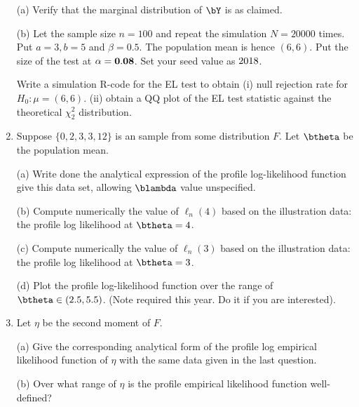 \begin{enumerate}
(a) Verify that the marginal distribution of $\bY$ is as claimed.

(b) Let the sample size $n=100$ and repeat the simulation $N=20000$ times.
Put $a = 3, b=5$ and $\beta = 0.5$. The population mean is hence
$(6, 6)$. Put the size of the test at $\alpha = {\bf 0.08}$. Set your seed value
as $2018\time7$.

Write a simulation R-code for the EL test to obtain 
(i) null rejection rate for  $H_0: \mu = (6, 6)$.
(ii) obtain a QQ plot of the EL test statistic against the theoretical $\chi_2^2$ distribution.

\item
Suppose $\{0, 2, 3, 3, 12\}$ is an \iid sample from some distribution $F$.
Let $\btheta$ be the population mean.

(a) Write done the analytical expression of the profile log-likelihood function give
this data set, allowing $\blambda$ value unspecified.

(b) Compute numerically the value of
$\ell_n(4)$ based on the illustration data: the profile log likelihood at $\btheta = 4$.

(c) Compute numerically the value of
$\ell_n(3)$ based on the illustration data: the profile log likelihood at $\btheta = 3$.

(d) Plot the profile log-likelihood function over the range of $\btheta \in (2.5, 5.5)$.
(Note required this year. Do it if you are interested).

\item
Let $\eta$ be the second moment of $F$.

(a) Give the corresponding analytical form of the profile log 
empirical likelihood function of $\eta$ with the same data given in the last
question.

(b) Over what range of $\eta$ is the profile empirical likelihood function
well-defined?
\end{enumerate}


